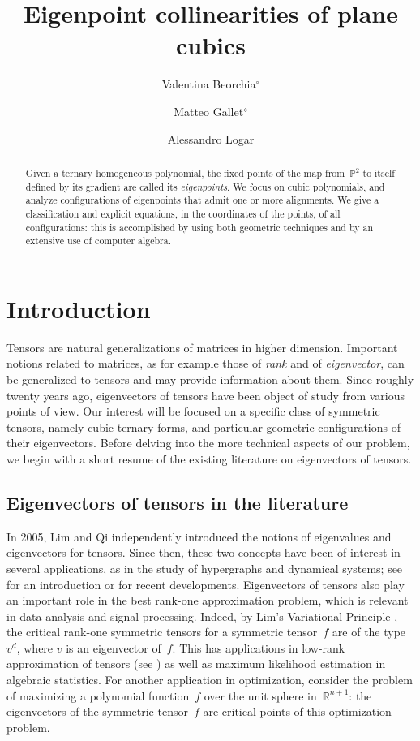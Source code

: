 \documentclass[a4paper, 11pt, reqno]{amsart}
\title{Eigenpoint collinearities of plane cubics}
\author[Valentina Beorchia]{Valentina Beorchia$^{\circ}$}
\author[Matteo Gallet]{Matteo Gallet$^{\diamond}$}
\author[Alessandro Logar]{Alessandro Logar}
\date{}
\theoremstyle{plain}
\theoremstyle{definition}
\newcommand{\R}{\mathbb{R}}
\newcommand{\p}{\mathbb{P}}
\begin{document}
\begin{abstract}
 Given a ternary homogeneous polynomial, the fixed points of the map from~$\p^2$ to itself defined by its gradient are called its \emph{eigenpoints}. We focus on cubic polynomials, and analyze configurations of eigenpoints that admit one or more alignments. We give a classification and explicit equations, in the coordinates of the points, of all configurations: this is accomplished by using both geometric techniques and by an extensive use of computer algebra. 
\end{abstract}

\maketitle


\section{Introduction}
\label{introduction}

Tensors are natural generalizations of matrices in higher dimension.
Important notions related to matrices, as for example those of \emph{rank} and of \emph{eigenvector},
can be generalized to tensors and may provide information about them.
Since roughly twenty years ago, eigenvectors of tensors have been object of study from various points of view.
Our interest will be focused on a specific class of symmetric tensors, namely cubic ternary forms, and particular geometric configurations of their eigenvectors.
Before delving into the more technical aspects of our problem,
we begin with a short resume of the existing literature on eigenvectors of tensors.

\subsection*{Eigenvectors of tensors in the literature}
In 2005, Lim \cite{Lim} and Qi \cite{Qi} independently introduced the notions of eigenvalues and eigenvectors for tensors.
Since then, these two concepts have been of interest in several applications,
as in the study of hypergraphs and dynamical systems;
see \cite[Section~4]{QZ} for an introduction or \cite{GMV} for recent developments.
Eigenvectors of tensors also play an important role in the best rank-one approximation problem,
which is relevant in data analysis and signal processing. 
Indeed, by Lim's Variational Principle \cite{Lim}, the critical rank-one symmetric tensors for a symmetric tensor~$f$ are of the type~$v^d$, where $v$ is an eigenvector of~$f$.
This has applications in low-rank approximation of tensors (see \cite{OttSod}) as well as maximum likelihood estimation in algebraic statistics.
For another application in optimization, consider the problem of maximizing a polynomial function~$f$ over the unit sphere in~$\R^{n+1}$: 
the eigenvectors of the symmetric tensor~$f$ are critical points of this optimization problem.
\end{document}
